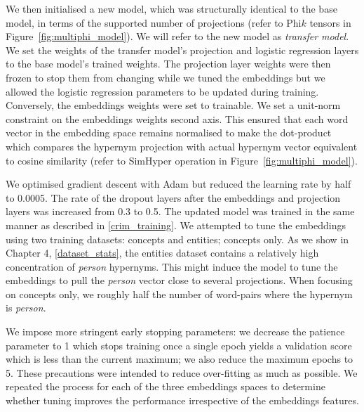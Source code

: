 We then initialised a new model, which was structurally identical to the base model, in terms of the supported number of projections (refer to Phi$k$ tensors in Figure~\ref{fig:multiphi_model}).  We will refer to the new model as \textit{transfer model}.  We set the weights of the transfer model's projection and logistic regression layers to the base model's trained weights.  The projection layer weights were then frozen to stop them from changing while we tuned the embeddings but we allowed the logistic regression parameters to be updated during training.  Conversely, the embeddings weights were set to trainable.  We set a unit-norm constraint on the embeddings weights second axis.  This ensured that each word vector in the embedding space remains normalised to make the dot-product which compares the hypernym projection with actual hypernym vector equivalent to cosine similarity (refer to SimHyper operation in Figure~\ref{fig:multiphi_model}).

We optimised gradient descent with Adam \citep{kingma2014adam} but reduced the learning rate by half to 0.0005.  The rate of the dropout layers after the embeddings and projection layers was increased from 0.3 to 0.5.  The updated model was trained in the same manner as described in \cref{crim_training}.  We attempted to tune the embeddings using two training datasets: concepts and entities; concepts only.  As we show in Chapter 4, \cref{dataset_stats}, the entities dataset contains a relatively high concentration of \textit{person} hypernyms.  This might induce the model to tune the embeddings to pull the \textit{person} vector close to several projections.  When focusing on concepts only, we roughly half the number of word-pairs where the hypernym is \textit{person}.

We impose more stringent early stopping parameters: we decrease the patience parameter to 1 which stops training once a single epoch yields a validation score which is less than the current maximum; we also reduce the maximum epochs to 5.  These precautions were intended to reduce over-fitting as much as possible.  We repeated the process for each of the three embeddings spaces to determine whether tuning improves the performance irrespective of the embeddings features.